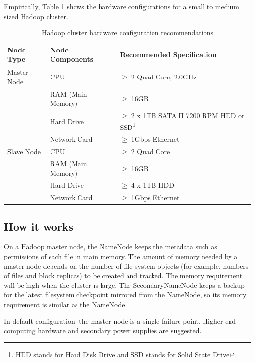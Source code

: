 Empirically, Table \ref{tbl:cluster.hardware} shows the hardware configurations for a small to medium sized Hadoop cluster. 
\begin{table}[h]
  \centering
  \begin{tabular}{lll}
    \toprule
    \textbf{Node Type} & \textbf{Node Components} & \textbf{Recommended Specification} \\ \midrule
    Master Node & CPU	& $\ge$ 2 Quad Core, 2.0GHz \\
    & RAM (Main Memory) & $\ge$ 16GB \\
    & Hard Drive & $\ge$ 2 x 1TB SATA II 7200 RPM HDD or SSD\footnote{HDD stands for Hard Disk Drive and SSD stands for Solid State Drive} \\
    & Network Card & $\ge$ 1Gbps Ethernet \\ \midrule
    Slave Node & CPU & $\ge$ 2 Quad Core \\
    & RAM (Main Memory) & $\ge$ 16GB \\
    & Hard Drive & $\ge$ 4 x 1TB HDD \\
    & Network Card & $\ge$ 1Gbps Ethernet \\ \bottomrule
  \end{tabular}
  \caption{Hadoop cluster hardware configuration recommendations}\label{tbl:cluster.hardware}
\end{table}
\subsection*{How it works}
On a Hadoop master node, the NameNode keeps the metadata such as permissions of each file in main memory. The amount of memory needed by a master node depends on the number of file system objects (for example, numbers of files and block replicas) to be created and tracked. The memory requirement will be high when the cluster is large. The SecondaryNameNode keeps a backup for the latest filesystem checkpoint mirrored from the NameNode, so its memory requirement is similar as the NameNode.

In default configuration, the master node is a single failure point. Higher end computing hardware and secondary power supplies are suggested.

